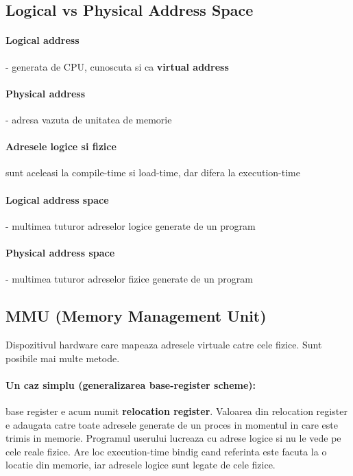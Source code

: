 \documentclass{article}
\begin{document}
\subsection*{Logical vs Physical Address Space}
\paragraph*{Logical address} - generata de CPU, cunoscuta si ca \textbf{virtual address}
\paragraph*{Physical address} - adresa vazuta de unitatea de memorie
\paragraph*{Adresele logice si fizice} sunt aceleasi la compile-time si load-time, dar difera la execution-time

\paragraph*{Logical address space} - multimea tuturor adreselor logice generate de un program
\paragraph*{Physical address space} - multimea tuturor adreselor fizice generate de un program

\subsection*{MMU (Memory Management Unit)}
Dispozitivul hardware care mapeaza adresele virtuale catre cele fizice. Sunt posibile mai multe metode.
\paragraph*{Un caz simplu (generalizarea base-register scheme): }  base register e acum numit \textbf{relocation register}. Valoarea din relocation register e adaugata catre toate adresele generate de un proces in momentul in care este trimis in memorie. Programul userului lucreaza cu adrese logice si nu le vede pe cele reale fizice. Are loc execution-time bindig cand referinta este facuta la o locatie din memorie, iar adresele logice sunt legate de cele fizice.
\end{document}
